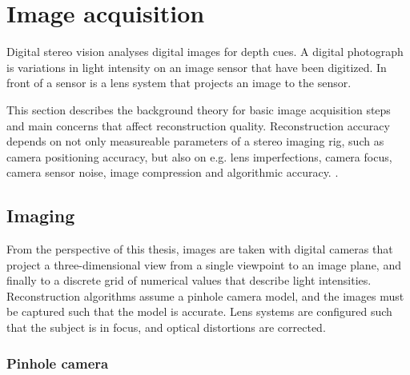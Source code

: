 


\section{Image acquisition}



Digital stereo vision analyses digital images for depth cues.
A digital photograph is variations in light intensity on an image sensor that have been digitized.
In front of a sensor is a lens system that projects an image to the sensor.

This section describes the background theory for basic image acquisition steps and main concerns that affect reconstruction quality.
Reconstruction accuracy depends on not only measureable parameters of a stereo imaging rig, such as camera positioning accuracy, but also on e.g. lens imperfections, camera focus, camera sensor noise, image compression and algorithmic accuracy. \cite{hollsten2013imagequality,kyto2011method,rieke2009evaluation}.

\subsection{Imaging} \label{sec:imaging} %

From the perspective of this thesis, images are taken with digital cameras that project a three-dimensional view from a single viewpoint to an image plane, and finally to a discrete grid of numerical values that describe light intensities.
Reconstruction algorithms assume a pinhole camera model, and the images must be captured such that the model is accurate.
Lens systems are configured such that the subject is in focus, and optical distortions are corrected.


\subsubsection{Pinhole camera} \label{sec:pinhole} %



